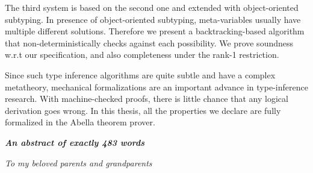 The third system is based on the second one and extended with object-oriented subtyping.
In presence of object-oriented subtyping,
meta-variables usually have multiple different solutions.
Therefore we present a backtracking-based algorithm that
non-deterministically checks against each possibility.
We prove soundness w.r.t our specification,
and also completeness under the rank-1 restriction.

Since such type inference algorithms are quite subtle and have a complex metatheory,
mechanical formalizations are an important advance in type-inference research.
With machine-checked proofs, there is little chance that any logical derivation goes wrong.
In this thesis, all the properties we declare are fully formalized in the Abella theorem prover.



\vspace{1.5\baselineskip}

\noindent\makebox[\linewidth]{\rule{0.7\textwidth}{0.4pt}}

\begin{center}
    \emph{\textbf{An abstract of exactly 483 words}}
\end{center}

\newpage

\begin{flushright}
  \null{}
  \textit{To my beloved parents and grandparents}
  \null
\end{flushright}


